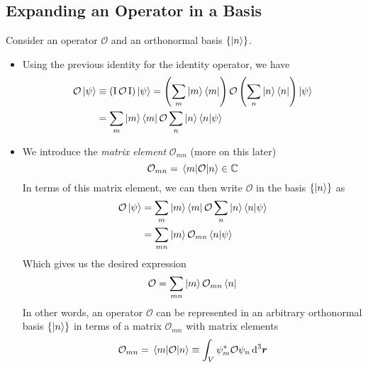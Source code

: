 \documentclass[11pt, a4paper]{article}
\newcommand{\diff}{\mathop{}\!\mathrm{d}} %
\newcommand{\dr}{\diff^{3} \r}  %
\renewcommand{\vec}[1]{\bm{#1}} %
\renewcommand{\r}{\vec{r}}  %
\renewcommand{\O}{\mathcal{O}}  %
\newcommand{\II}{\operatorname{I}}  %
\newcommand{\p}{\psi}  %
\begin{document}
\subsection{Expanding an Operator in a Basis}
Consider an operator $ \O $ and an orthonormal basis $ \{\ket{n}\} $. 
\begin{itemize}
	\item Using the previous identity for the identity operator, we have
	\begin{align*}
		\O \ket{\p} &\equiv (\II \O \II) \ket{\p} = \left(\sum_{m} \ket{m} \bra{m}\right) \O \left(\sum_{n} \ket{n} \bra{n}\right) \ket{\p}\\
		& = \sum_{m}\ket{m}\bra{m} \O \sum_{n} \ket{n} \braket{n}{\p}
	\end{align*}
	
	\item We introduce the \textit{matrix element} $ \O_{mn} $ (more on this later)
	\begin{equation*}
		\O_{mn} = \mel{m}{\O}{n} \in \mathbb{C}
	\end{equation*}
	In terms of this matrix element, we can then write $ \O $ in the basis $ \{\ket{n}\} $ as
	\begin{align*}
		\O \ket{\p} & = \sum_{m}\ket{m}\bra{m} \O \sum_{n} \ket{n} \braket{n}{\p}\\
		& = \sum_{mn} \ket{m}\O_{mn}\bra{n} \ket{\p}
	\end{align*}
	Which gives us the desired expression
	\begin{equation*}
		\O = \sum_{mn} \ket{m}\O_{mn}\bra{n}
	\end{equation*}
	In other words, an operator $ \O $ can be represented in an arbitrary orthonormal basis $ \{\ket{n}\} $ in terms of a matrix $ \O_{mn} $ with matrix elements
	\begin{equation*}
		\O_{mn} = \mel{m}{\O}{n} \equiv \int_{V} \psi_{m}^{*}\O \psi_{n} \dr 
	\end{equation*}
	

\end{itemize}
\end{document}
